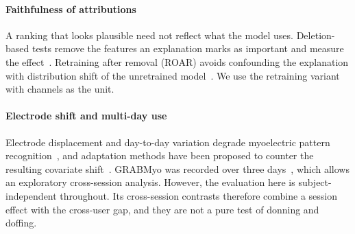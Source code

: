 \paragraph{Faithfulness of attributions}
A ranking that looks plausible need not reflect what the model uses. Deletion-based tests remove the features an explanation marks as important and measure the effect~\cite{samek2017evaluating}. Retraining after removal (ROAR) avoids confounding the explanation with distribution shift of the unretrained model~\cite{hooker2019benchmark}. We use the retraining variant with channels as the unit.

\paragraph{Electrode shift and multi-day use}
Electrode displacement and day-to-day variation degrade myoelectric pattern recognition~\cite{hargrove2006effect,kaufmann2010fluctuating}, and adaptation methods have been proposed to counter the resulting covariate shift~\cite{vidovic2016improving,muceli2014extracting}. GRABMyo was recorded over three days~\cite{pradhan2022multiday}, which allows an exploratory cross-session analysis. However, the evaluation here is subject-independent throughout. Its cross-session contrasts therefore combine a session effect with the cross-user gap, and they are not a pure test of donning and doffing.
